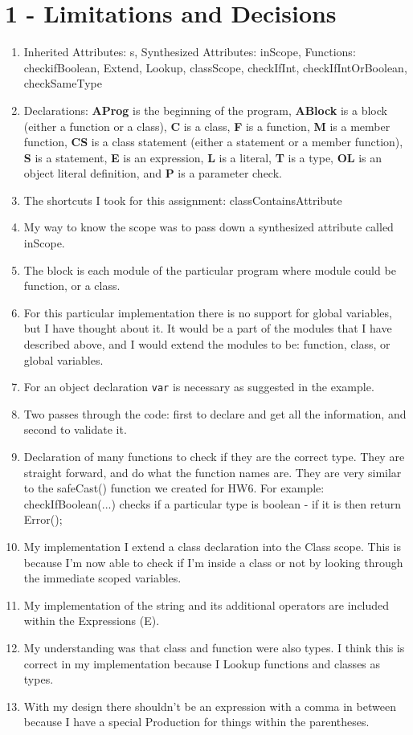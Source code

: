 \documentclass[11pt, oneside]{article}
\begin{document}
\section*{1 - Limitations and Decisions}
\begin{enumerate}
\item Inherited Attributes: s, Synthesized Attributes: inScope, Functions: checkifBoolean, Extend, Lookup, classScope, checkIfInt, checkIfIntOrBoolean, checkSameType
\item Declarations: \textbf{AProg} is the beginning of the program, \textbf{ABlock} is a block (either a function or a class), \textbf{C} is a class, \textbf{F} is a function, \textbf{M} is a member function, \textbf{CS} is a class statement (either a statement or a member function), \textbf{S} is a statement, \textbf{E} is an expression, \textbf{L} is a literal, \textbf{T} is a type, \textbf{OL} is an object literal definition, and \textbf{P} is a parameter check.
\item The shortcuts I took for this assignment: classContainsAttribute
\item My way to know the scope was to pass down a synthesized attribute called inScope.
\item The block is each module of the particular program where module could be function, or a class.
\item For this particular implementation there is no support for global variables, but I have thought about it. It would be a part of the modules that I have described above, and I would extend the modules to be: function, class, or global variables.
\item  For an object declaration \texttt{var} is necessary as suggested in the example.
\item Two passes through the code: first to declare and get all the information, and second to validate it.
\item Declaration of many functions to check if they are the correct type. They are straight forward, and do what the function names are. They are very similar to the safeCast() function we created for HW6. For example: checkIfBoolean(...) checks if a particular type is boolean - if it is then return Error();
\item My implementation I extend a class declaration into the Class scope. This is because I'm now able to check if I'm inside a class or not by looking through the immediate scoped variables.
\item My implementation of the string and its additional operators are included within the Expressions (E).
\item My understanding was that class and function were also types. I think this is correct in my implementation because I Lookup functions and classes as types.
\item With my design there shouldn't be an expression with a comma in between because I have a special Production for things within the parentheses. 


\end{enumerate}
\end{document}
